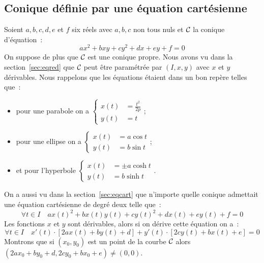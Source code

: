 \subsection{Conique définie par une équation cartésienne}
Soient \(a,b,c,d,e\) et \(f\) six réels avec \(a,b,c\) non tous nuls et \(\mathcal{C}_{{}}\) la conique d'équation~:
\begin{equation}
  ax^2+bxy+cy^2+dx+ey+f=0
\end{equation}
On suppose de plus que \(\mathcal{C}_{{}}\) est une conique propre. Nous avons vu dans la section~\ref{sec:eqred} que \(\mathcal{C}_{{}}\) peut être paramétrée par \((I,x,y)\) avec \(x\) et \(y\) dérivables. Nous rappelons que les équations étaient dans un bon repère telles que~:
\begin{itemize}
\item pour une parabole on a \(\begin{cases} x(t) &= \frac{t^2}{2p} \\ y(t) &= t \end{cases}\);
\item pour une ellipse on a \(\begin{cases} x(t) &= a\cos t\\ y(t) &= b\sin t \end{cases}\);
\item  et pour l'hyperbole \(\begin{cases} x(t) &= \pm a\cosh t\\ y(t) &= b\sinh t \end{cases}\).
\end{itemize}
On a aussi vu dans la section~\ref{sec:eqcart} que n'importe quelle conique admettait une équation cartésienne de degré deux telle que~:
\begin{equation}
\forall t \in I \quad   ax(t)^2+bx(t)y(t)+cy(t)^2+dx(t)+ey(t)+f=0
\end{equation}
Les fonctions \(x\) et \(y\) sont dérivables, alors si on dérive cette équation on a~:
\begin{equation}
  \forall t \in I \quad x'(t) \cdot [2ax(t)+by(t)+d]+y'(t) \cdot [2cy(t)+bx(t)+e]=0
\end{equation}
Montrons que si \((x_0,y_0)\) est un point de la courbe \(\mathcal{C}_{{}}\) alors \((2ax_0+by_0+d,2cy_0+bx_0+e)\neq (0,0)\).
